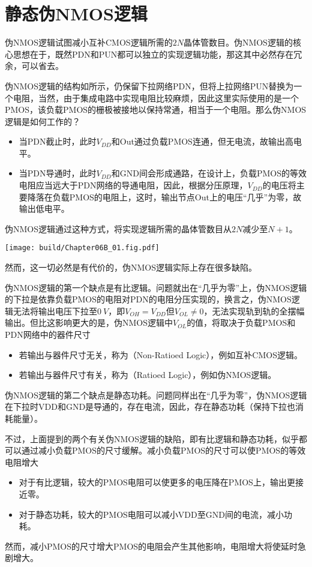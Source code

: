 \section{静态伪NMOS逻辑}
伪NMOS逻辑试图减小互补CMOS逻辑所需的$2N$晶体管数目。伪NMOS逻辑的核心思想在于，既然PDN和PUN都可以独立的实现逻辑功能，那这其中必然存在冗余，可以省去。

伪NMOS逻辑的结构如所示，仍保留下拉网络PDN，但将上拉网络PUN替换为一个电阻，当然，由于集成电路中实现电阻比较麻烦，因此这里实际使用的是一个PMOS，该负载PMOS的栅极被接地以保持常通，相当于一个电阻。那么伪NMOS逻辑是如何工作的？
\begin{itemize}
    \item 当PDN截止时，此时$V_{DD}$和Out通过负载PMOS连通，但无电流，故输出高电平。
    \item 当PDN导通时，此时$V_{DD}$和GND间会形成通路，在设计上，负载PMOS的等效电阻应当远大于PDN网络的导通电阻，因此，根据分压原理，$V_{DD}$的电压将主要降落在负载PMOS的电阻上，这时，输出节点Out上的电压“几乎”为零，故输出低电平。
\end{itemize}
伪NMOS逻辑通过这种方式，将实现逻辑所需的晶体管数目从$2N$减少至$N+1$。

\begin{Figure}[静态伪NMOS逻辑]
    \texttt{[image: build/Chapter06B\_01.fig.pdf]}
\end{Figure}

然而，这一切必然是有代价的，伪NMOS逻辑实际上存在很多缺陷。

伪NMOS逻辑的第一个缺点是有比逻辑。问题就出在“几乎为零”上，伪NMOS逻辑的下拉是依靠负载PMOS的电阻对PDN的电阻分压实现的，换言之，伪NMOS逻辑无法将输出电压下拉至$\SI{0}{V}$，即$V_{OH}=V_{DD}$但$V_{OL}\neq 0$，无法实现轨到轨的全摆幅输出。但比这影响更大的是，伪NMOS逻辑中$V_{OL}$的值，将取决于负载PMOS和PDN网络中的器件尺寸
\begin{itemize}
    \item 若输出与器件尺寸无关，称为（Non-Ratioed Logic），例如互补CMOS逻辑。
    \item 若输出与器件尺寸有关，称为（Ratioed Logic），例如伪NMOS逻辑。
\end{itemize}\goodbreak

伪NMOS逻辑的第二个缺点是静态功耗。问题同样出在“几乎为零”，伪NMOS逻辑在下拉时VDD和GND是导通的，存在电流，因此，存在静态功耗（保持下拉也消耗能量）。

不过，上面提到的两个有关伪NMOS逻辑的缺陷，即有比逻辑和静态功耗，似乎都可以通过减小负载PMOS的尺寸缓解。减小负载PMOS的尺寸可以使PMOS的等效电阻增大
\begin{itemize}
    \item 对于有比逻辑，较大的PMOS电阻可以使更多的电压降在PMOS上，输出更接近零。
    \item 对于静态功耗，较大的PMOS电阻可以减小VDD至GND间的电流，减小功耗。
\end{itemize}
然而，减小PMOS的尺寸增大PMOS的电阻会产生其他影响，电阻增大将使延时急剧增大。\goodbreak

